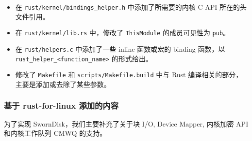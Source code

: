 \begin{itemize}
  \item 在 \texttt{rust/kernel/bindings_helper.h} 中添加了所需要的内核 C API 所在的头文件引用。
  \item 在 \texttt{rust/kernel/lib.rs} 中，修改了 \texttt{ThisModule} 的成员可见性为 \texttt{pub}。
  \item 在 \texttt{rust/helpers.c} 中添加了一些 inline 函数或宏的 binding 函数，以 \texttt{rust_helper_<function_name>} 的形式给出。
  \item 修改了 \texttt{Makefile} 和 \texttt{scripts/Makefile.build} 中与 Rust 编译相关的部分，主要是添加或去除了某些参数。
\end{itemize}


\subsubsection{基于 rust-for-linux 添加的内容}

为了实现 SwornDisk，我们主要补充了关于块 I/O, Device Mapper, 内核加密 API 和内核工作队列 CMWQ 的支持。

